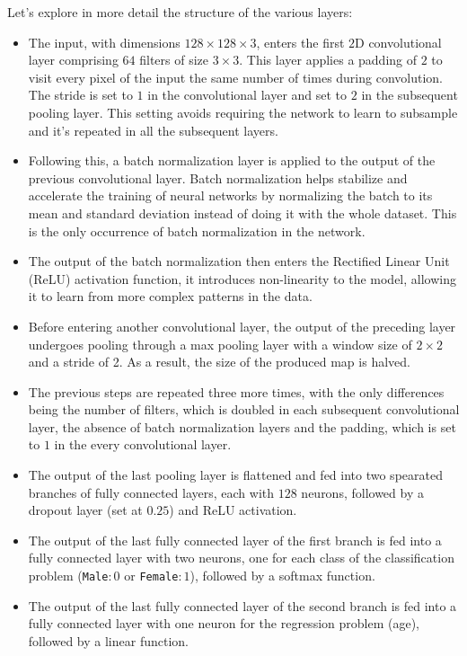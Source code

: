 Let's explore in more detail the structure of the various layers:
\begin{itemize}
    \item The input, with dimensions $128\times128\times3$, enters
    the first $2$D convolutional layer comprising $64$ filters of size $3\times3$.
    This layer applies a padding of $2$ to visit every pixel
    of the input the same number of times
    during convolution. The stride is set to $1$
    in the convolutional layer and set to $2$ in the subsequent 
    pooling layer. This setting avoids requiring the network to learn
    to subsample and it's repeated in all the subsequent layers.
    \item Following this, a batch normalization layer is applied
    to the output of the previous convolutional layer.
    Batch normalization helps stabilize and accelerate
    the training of neural networks by normalizing the batch to its
    mean and standard deviation instead of doing it with the whole dataset.
    This is the only occurrence of batch normalization in the network.
    \item The output of the batch normalization then enters
    the Rectified Linear Unit (ReLU) activation function,
    it introduces non-linearity to the model,
    allowing it to learn from more complex patterns in the data.
    \item Before entering another convolutional layer,
    the output of the preceding layer undergoes pooling through
    a max pooling layer with a window size of $2\times2$ and a stride of 2.
    As a result, the size of the produced map is halved.
    \item The previous steps are repeated three more times,
    with the only differences being the number of filters,
    which is doubled in each subsequent convolutional layer,
    the absence of batch normalization layers and the padding,
    which is set to $1$ in the every convolutional layer.
    \item The output of the last pooling layer is flattened
    and fed into two spearated branches of fully connected layers,
    each with $128$ neurons,
    followed by a dropout layer (set at $0.25$) and ReLU activation.
    \item The output of the last fully connected layer of the first branch
    is fed into a fully connected layer with two neurons,
    one for each class of the classification problem
    (\texttt{Male}$: 0$ or \texttt{Female}$: 1$), followed by a softmax function.
    \item The output of the last fully connected layer of the second branch
    is fed into a fully connected layer with one neuron
    for the regression problem (age), followed by a linear function.
\end{itemize}


